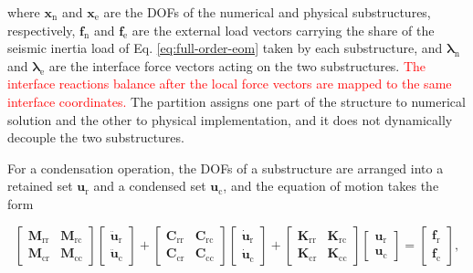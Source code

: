 \documentclass[a4paper,fleqn,review,12pt]{cas-sc}
\numberwithin{equation}{section}
\newcommand{\rev}[1]{\textcolor{red}{#1}}
\begin{document}
\noindent where \(\bm{x}_{\mathrm{n}}\) and \(\bm{x}_{\mathrm{e}}\) are the DOFs of the numerical and physical substructures, respectively, \(\bm{f}_{\mathrm{n}}\) and \(\bm{f}_{\mathrm{e}}\) are the external load vectors carrying the share of the seismic inertia load of Eq. \eqref{eq:full-order-eom} taken by each substructure, and \(\bm{\lambda}_{\mathrm{n}}\) and \(\bm{\lambda}_{\mathrm{e}}\) are the interface force vectors acting on the two substructures. \rev{The interface reactions balance after the local force vectors are mapped to the same interface coordinates.} The partition assigns one part of the structure to numerical solution and the other to physical implementation, and it does not dynamically decouple the two substructures.

For a condensation operation, the DOFs of a substructure are arranged into a retained set \(\bm{u}_{\mathrm{r}}\) and a condensed set \(\bm{u}_{\mathrm{c}}\), and the equation of motion takes the form

\vspace{-3.5em}
\begin{equation}
	\begin{bmatrix}
		\mathbf{M}_{\mathrm{rr}} & \mathbf{M}_{\mathrm{rc}}\\
		\mathbf{M}_{\mathrm{cr}} & \mathbf{M}_{\mathrm{cc}}
	\end{bmatrix}
	\begin{bmatrix}
		\ddot{\bm{u}}_{\mathrm{r}}\\
		\ddot{\bm{u}}_{\mathrm{c}}
	\end{bmatrix}
	+
	\begin{bmatrix}
		\mathbf{C}_{\mathrm{rr}} & \mathbf{C}_{\mathrm{rc}}\\
		\mathbf{C}_{\mathrm{cr}} & \mathbf{C}_{\mathrm{cc}}
	\end{bmatrix}
	\begin{bmatrix}
		\dot{\bm{u}}_{\mathrm{r}}\\
		\dot{\bm{u}}_{\mathrm{c}}
	\end{bmatrix}
	+
	\begin{bmatrix}
		\mathbf{K}_{\mathrm{rr}} & \mathbf{K}_{\mathrm{rc}}\\
		\mathbf{K}_{\mathrm{cr}} & \mathbf{K}_{\mathrm{cc}}
	\end{bmatrix}
	\begin{bmatrix}
		\bm{u}_{\mathrm{r}}\\
		\bm{u}_{\mathrm{c}}
	\end{bmatrix}
	=
	\begin{bmatrix}
		\bm{f}_{\mathrm{r}}\\
		\bm{f}_{\mathrm{c}}
	\end{bmatrix},
	\label{eq:partitioned-local-eom}
\end{equation}
\vspace{-3.5em}
\end{document}
